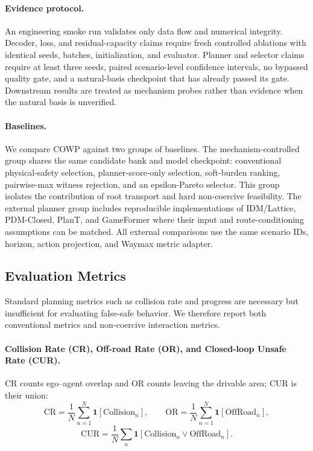 \documentclass[10pt]{article}
\begin{document}
\paragraph{Evidence protocol.}
An engineering smoke run validates only data flow and numerical integrity. Decoder, loss, and residual-capacity claims require fresh controlled ablations with identical seeds, batches, initialization, and evaluator. Planner and selector claims require at least three seeds, paired scenario-level confidence intervals, no bypassed quality gate, and a natural-basis checkpoint that has already passed its gate. Downstream results are treated as mechanism probes rather than evidence when the natural basis is unverified.

\paragraph{Baselines.}
We compare COWP against two groups of baselines. The mechanism-controlled group shares the same candidate bank and model checkpoint: conventional physical-safety selection, planner-score-only selection, soft-burden ranking, pairwise-max witness rejection, and an epsilon-Pareto selector. This group isolates the contribution of root transport and hard non-coercive feasibility. The external planner group includes reproducible implementations of IDM/Lattice, PDM-Closed, PlanT, and GameFormer where their input and route-conditioning assumptions can be matched. All external comparisons use the same scenario IDs, horizon, action projection, and Waymax metric adapter.

\subsection{Evaluation Metrics}
\label{sec:metrics}

Standard planning metrics such as collision rate and progress are necessary but insufficient for evaluating false-safe behavior. We therefore report both conventional metrics and non-coercive interaction metrics.

\paragraph{Collision Rate (CR), Off-road Rate (OR), and Closed-loop Unsafe Rate (CUR).}
CR counts ego--agent overlap and OR counts leaving the drivable area; CUR is their union:
\begin{equation}
    \mathrm{CR}=\frac{1}{N}\sum_{n=1}^{N}\mathbf{1}[\mathrm{Collision}_n],
    \qquad
    \mathrm{OR}=\frac{1}{N}\sum_{n=1}^{N}\mathbf{1}[\mathrm{OffRoad}_n],
\end{equation}
\begin{equation}
    \mathrm{CUR}=\frac{1}{N}\sum_n\mathbf{1}[\mathrm{Collision}_n\vee\mathrm{OffRoad}_n].
\end{equation}
\end{document}
